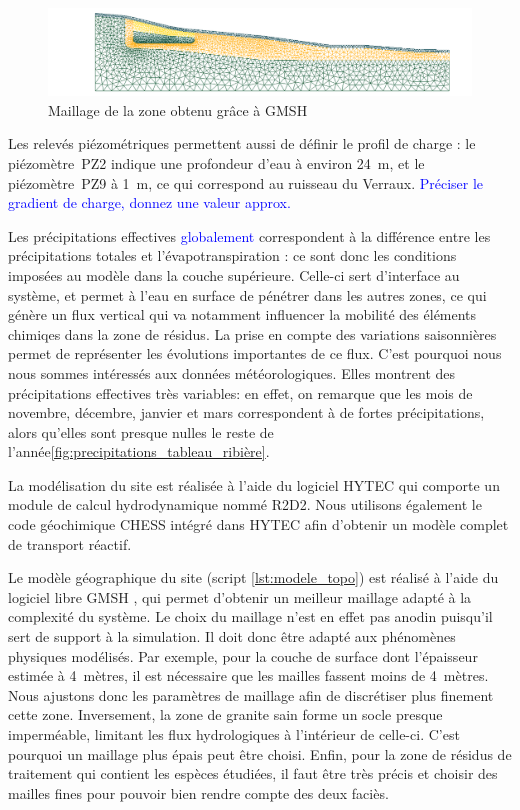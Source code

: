 \documentclass{article}
\newcommand{\blue}[1]{\textcolor{blue}{#1}} %
\begin{document}
\begin{figure}[H]
    \centering
    \includegraphics[width=1.0\linewidth]{III_B_3_4.png}
    \caption{Maillage de la zone obtenu grâce à GMSH}
    \label{maillage_ribiere}
\end{figure}

Les relevés piézométriques permettent aussi de définir le profil de charge : le piézomètre~PZ2 indique une profondeur d’eau à environ 24~m, et le piézomètre~PZ9 à 1~m, ce qui correspond au ruisseau du Verraux. \blue{Préciser le gradient de charge, donnez une valeur approx.}

Les précipitations effectives \blue{globalement} correspondent à la différence entre les précipitations totales et l'évapotranspiration : ce sont donc les conditions imposées au modèle dans la couche supérieure. Celle-ci sert d'interface au système, et permet à l'eau en surface de pénétrer dans les autres zones, ce qui génère un flux vertical qui va notamment influencer la mobilité des éléments chimiqes dans la zone de résidus. 
La prise en compte des variations saisonnières permet de représenter les évolutions importantes de ce flux.
C'est pourquoi nous nous sommes intéressés aux données météorologiques. Elles montrent des précipitations effectives très variables: en effet, on remarque que les mois de novembre, décembre, janvier et mars correspondent à de fortes précipitations, alors qu’elles sont presque nulles le reste de l’année\ref{fig:precipitations_tableau_ribière}.

La modélisation du site est réalisée à l'aide du logiciel HYTEC qui comporte un module de calcul hydrodynamique nommé R2D2. Nous utilisons également le code géochimique CHESS intégré dans HYTEC \cite{van_der_lee_module-oriented_2003} afin d'obtenir un modèle complet de transport réactif.

Le modèle géographique du site (script \ref{lst:modele_topo}) est réalisé à l'aide du logiciel libre GMSH \cite{geuzaine_gmsh}, qui permet d'obtenir un meilleur maillage adapté à la complexité du système. Le choix du maillage n'est en effet pas anodin puisqu'il sert de support à la simulation. Il doit donc être adapté aux phénomènes physiques modélisés. Par exemple, pour la couche de surface dont l'épaisseur estimée à 4~mètres, il est nécessaire que les mailles fassent moins de 4~mètres. Nous ajustons donc les paramètres de maillage afin de discrétiser plus finement cette zone. Inversement, la zone de granite sain forme un socle presque imperméable, limitant les flux hydrologiques à l'intérieur de celle-ci. C'est pourquoi un maillage plus épais peut être choisi. Enfin, pour la zone de résidus de traitement qui contient les espèces étudiées, il faut être très précis et choisir des mailles fines pour pouvoir bien rendre compte des deux faciès.
\end{document}
